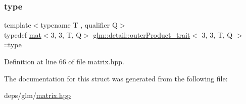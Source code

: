 \subsubsection{\texorpdfstring{type}{type}}
{\footnotesize\ttfamily template$<$typename T , qualifier Q$>$ \\
typedef \hyperlink{structglm_1_1mat}{mat}$<$3, 3, T, Q$>$ \hyperlink{structglm_1_1detail_1_1outerProduct__trait}{glm\+::detail\+::outer\+Product\+\_\+trait}$<$ 3, 3, T, Q $>$\+::\hyperlink{structglm_1_1mat_3_013_00_013_00_01T_00_01Q_01_4}{type}}



Definition at line 66 of file matrix.\+hpp.



The documentation for this struct was generated from the following file\+:\begin{DoxyCompactItemize}
\item 
deps/glm/\hyperlink{matrix_8hpp}{matrix.\+hpp}\end{DoxyCompactItemize}
